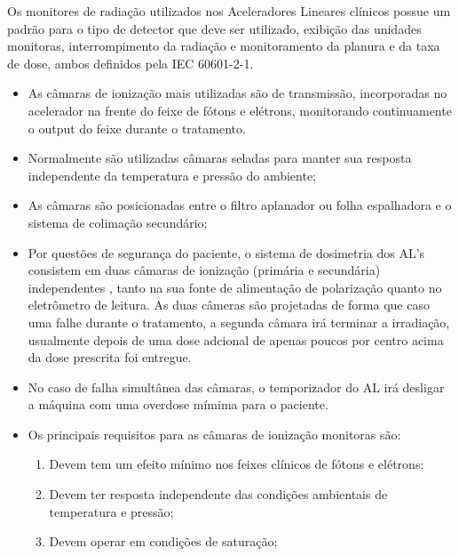 \documentclass[11pt,a4paper]{article}
\begin{document}
                    Os monitores de radiação utilizados nos Aceleradores Lineares clínicos possue um padrão para o tipo de detector que deve ser utilizado, exibição das unidades monitoras, interrompimento da radiação e monitoramento da planura e da taxa de dose, ambos definidos pela IEC 60601-2-1.

                    \begin{itemize}
                        \item As câmaras de ionização mais utilizadas são de transmissão, incorporadas no acelerador na frente do feixe de fótons e elétrons, monitorando continuamente o output do feixe durante o tratamento.
                        
                        \item Normalmente são utilizadas câmaras seladas para manter sua resposta independente da temperatura e pressão do ambiente;
                        
                        \item As câmaras são posicionadas entre o filtro aplanador ou folha espalhadora e o sistema de colimação secundário;
                        
                        \item Por questões de segurança do paciente, o sistema de dosimetria dos AL's consistem em duas câmaras de ionização (primária e secundária) independentes , tanto na sua fonte de alimentação de polarização quanto no eletrômetro de leitura. As duas câmeras são projetadas de forma que caso uma falhe durante o tratamento, a segunda câmara irá terminar a irradiação, usualmente depois de uma dose adcional de apenas poucos por centro acima da dose prescrita foi entregue.
                        
                        \item No caso de falha simultânea das câmaras, o temporizador do AL irá desligar a máquina com uma overdose mímima para o paciente.
                        
                        \item Os principais requisitos para as câmaras de ionização monitoras são:
                        
                            \begin{enumerate}
                                \item Devem tem um efeito mínimo nos feixes clínicos de fótons e elétrons;
                                \item Devem ter resposta independente das condições ambientais de temperatura e pressão;
                                \item Devem operar em condições de saturação;
                            \end{enumerate}
                        

\end{itemize}
\end{document}
